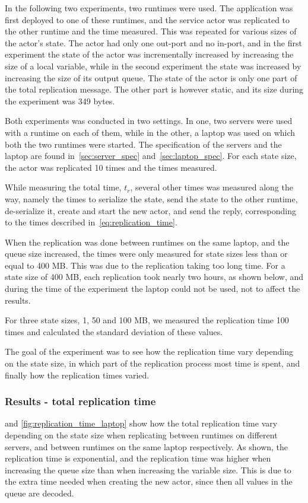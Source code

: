 \documentclass{cslthse-msc}
\begin{document}
In the following two experiments, two runtimes were used. The application was first deployed to one of these runtimes, and the service actor was replicated to the other runtime and the time measured. This was repeated for various sizes of the actor's state. The actor had only one out-port and no in-port, and in the first experiment the state of the actor was incrementally increased by increasing the size of a local variable, while in the second experiment the state was increased by increasing the size of its output queue. The state of the actor is only one part of the total replication message. The other part is however static, and its size during the experiment was 349 bytes.

Both experiments was conducted in two settings. In one, two servers were used with a runtime on each of them, while in the other, a laptop was used on which both the two runtimes were started. The specification of the servers and the laptop are found in~\cref{sec:server_spec} and~\cref{sec:laptop_spec}. For each state size, the actor was replicated 10 times and the times measured.

While measuring the total time, $t_r$, several other times was measured along the way, namely the times to serialize the state, send the state to the other runtime, de-serialize it, create and start the new actor, and send the reply, corresponding to the times described in~\cref{eq:replication_time}.

When the replication was done between runtimes on the same laptop, and the queue size increased, the times were only measured for state sizes less than or equal to 400 MB. This was due to the replication taking too long time. For a state size of 400 MB, each replication took nearly two hours, as shown below, and during the time of the experiment the laptop could not be used, not to affect the results.

For three state sizes, 1, 50 and 100 MB, we measured the replication time 100 times and calculated the standard deviation of these values.

The goal of the experiment was to see how the replication time vary depending on the state size, in which part of the replication process most time is spent, and finally how the replication times varied.

\subsubsection*{Results - total replication time}
 and \cref{fig:replication_time_laptop} show how the total replication time vary depending on the state size when replicating between runtimes on different servers, and between runtimes on the same laptop respectively. As shown, the replication time is exponential, and the replication time was higher when increasing the queue size than when increasing the variable size. This is due to the extra time needed when creating the new actor, since then all values in the queue are decoded. %
\end{document}
